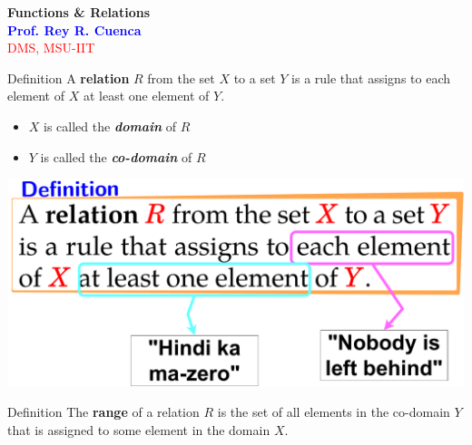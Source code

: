 \documentclass[extrafontsizes,60pt]{memoir}
\newcommand{\fonter}[1]{\fontsize{#1}{#1}\selectfont}
\newenvironment{dbox}[1]
  {\begin{defn}{#1}}
  {\end{defn}}
\begin{document}
\vspace{1mm}
\begin{center}
{\fonter{130pt}\bfseries Functions \& Relations}\\[150pt]
{\fonter{50pt} \bfseries\textcolor{blue}{Prof. Rey R. Cuenca}}\\
{\fonter{30pt} \textcolor{red}{DMS, MSU-IIT}}
\end{center}
\newpage

\clearpage

\begin{dbox}{Definition}
A \textbf{relation} \(R\) from the set \(X\) to a set \(Y\) is a rule that assigns to each element of \(X\) at least one element of \(Y\).

\end{dbox}

\fonter{60pt}
\begin{itemize}
 \item[] $X$ is called the \textit{\bfseries domain} of $R$
 \item[] $Y$ is called the \textit{\bfseries co-domain} of $R$
\end{itemize}

\newpage
\begin{center}
\includegraphics[width=\linewidth]{img/relations-slide-01-annotation.pdf}
\end{center}
\newpage

\begin{dbox}{Definition}
The \textbf{range} of a relation \(R\) is the set of all elements in the co-domain \(Y\) that is assigned to some element in the domain \(X\).

\end{dbox}
\end{document}
